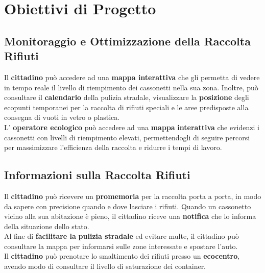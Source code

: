 \section{Obiettivi di Progetto}


\subsection{Monitoraggio e Ottimizzazione della Raccolta Rifiuti}
\begin{itemize}
Il \textbf{cittadino} può accedere ad una \textbf{mappa interattiva} che gli permetta di vedere in tempo reale il livello
di riempimento dei cassonetti nella sua zona. Inoltre, può consultare il \textbf{calendario} della pulizia stradale, visualizzare la \textbf{posizione} degli ecopunti temporanei per la raccolta di rifiuti speciali e le aree predisposte alla consegna di vuoti in vetro o plastica.
\\L' \textbf{operatore ecologico} può accedere ad una \textbf{mappa} \textbf{interattiva} che evidenzi i cassonetti con livelli di riempimento
elevati, permettendogli di seguire percorsi per massimizzare l’efficienza della raccolta e ridurre i
tempi di lavoro.
\end{itemize}

\subsection{Informazioni sulla Raccolta Rifiuti}
\begin{itemize}
Il \textbf{cittadino} può ricevere un \textbf{promemoria} per la raccolta porta a porta, in modo da sapere con precisione quando e dove lasciare i rifiuti. Quando un cassonetto vicino alla sua abitazione è pieno, il cittadino riceve una \textbf{notifica} che lo informa della situazione dello stato.\\Al fine di \textbf{facilitare la} \textbf{pulizia stradale}\textbf{ }ed evitare multe, il cittadino può consultare la mappa per informarsi sulle zone interessate e spostare l'auto.
\\Il \textbf{cittadino} può prenotare lo smaltimento dei rifiuti presso un \textbf{ecocentro}, avendo modo di consultare il livello di saturazione dei container.

\end{itemize}

